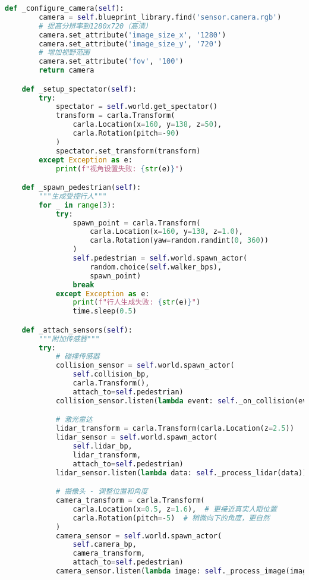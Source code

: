 \begin{lstlisting}[language=Python]
    def _configure_camera(self):
        camera = self.blueprint_library.find('sensor.camera.rgb')
        # 提高分辨率到1280x720（高清）
        camera.set_attribute('image_size_x', '1280')
        camera.set_attribute('image_size_y', '720')
        # 增加视野范围
        camera.set_attribute('fov', '100')
        return camera

    def _setup_spectator(self):
        try:
            spectator = self.world.get_spectator()
            transform = carla.Transform(
                carla.Location(x=160, y=138, z=50),
                carla.Rotation(pitch=-90)
            )
            spectator.set_transform(transform)
        except Exception as e:
            print(f"视角设置失败: {str(e)}")

    def _spawn_pedestrian(self):
        """生成受控行人"""
        for _ in range(3):
            try:
                spawn_point = carla.Transform(
                    carla.Location(x=160, y=138, z=1.0),
                    carla.Rotation(yaw=random.randint(0, 360))
                )
                self.pedestrian = self.world.spawn_actor(
                    random.choice(self.walker_bps),
                    spawn_point)
                break
            except Exception as e:
                print(f"行人生成失败: {str(e)}")
                time.sleep(0.5)

    def _attach_sensors(self):
        """附加传感器"""
        try:
            # 碰撞传感器
            collision_sensor = self.world.spawn_actor(
                self.collision_bp,
                carla.Transform(),
                attach_to=self.pedestrian)
            collision_sensor.listen(lambda event: self._on_collision(event))

            # 激光雷达
            lidar_transform = carla.Transform(carla.Location(z=2.5))
            lidar_sensor = self.world.spawn_actor(
                self.lidar_bp,
                lidar_transform,
                attach_to=self.pedestrian)
            lidar_sensor.listen(lambda data: self._process_lidar(data))

            # 摄像头 - 调整位置和角度
            camera_transform = carla.Transform(
                carla.Location(x=0.5, z=1.6),  # 更接近真实人眼位置
                carla.Rotation(pitch=-5)  # 稍微向下的角度，更自然
            )
            camera_sensor = self.world.spawn_actor(
                self.camera_bp,
                camera_transform,
                attach_to=self.pedestrian)
            camera_sensor.listen(lambda image: self._process_image(image))


\end{lstlisting}
